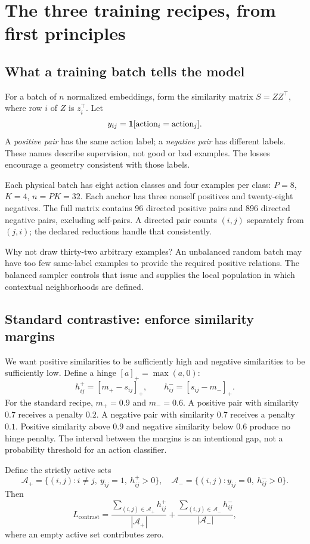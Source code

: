 \clearpage
\section{The three training recipes, from first principles}\label{sec:losses}
\subsection{What a training batch tells the model}
For a batch of $n$ normalized embeddings, form the similarity matrix
$S=ZZ^\top$, where row $i$ of $Z$ is $z_i^\top$. Let
\[
 y_{ij}=\mathbf{1}[\text{action}_i=\text{action}_j].
\]
A \emph{positive pair} has the same action label; a \emph{negative pair} has
different labels. These names describe supervision, not good or bad examples.
The losses encourage a geometry consistent with those labels.

Each physical batch has eight action classes and four examples per class:
$P=8$, $K=4$, $n=PK=32$. Each anchor has three nonself positives and twenty-eight
negatives. The full matrix contains 96 directed positive pairs and 896 directed
negative pairs, excluding self-pairs. A directed pair counts $(i,j)$ separately
from $(j,i)$; the declared reductions handle that consistently.

Why not draw thirty-two arbitrary examples? An unbalanced random batch may have
too few same-label examples to provide the required positive relations. The
balanced sampler controls that issue and supplies the local population in which
contextual neighborhoods are defined.

\subsection{Standard contrastive: enforce similarity margins}
We want positive similarities to be sufficiently high and negative similarities
to be sufficiently low. Define a hinge $[a]_+=\max(a,0)$:
\[
 h^+_{ij}=[m_+-s_{ij}]_+,
 \qquad h^-_{ij}=[s_{ij}-m_-]_+.
\]
For the standard recipe, $m_+=0.9$ and $m_-=0.6$. A positive pair with
similarity $0.7$ receives a penalty $0.2$. A negative pair with similarity $0.7$
receives a penalty $0.1$. Positive similarity above $0.9$ and negative similarity
below $0.6$ produce no hinge penalty. The interval between the margins is an
intentional gap, not a probability threshold for an action classifier.

Define the strictly active sets
\[
 \mathcal A_+=\{(i,j):i\ne j,\ y_{ij}=1,\ h^+_{ij}>0\},\quad
 \mathcal A_-=\{(i,j):y_{ij}=0,\ h^-_{ij}>0\}.
\]
Then
\[
 L_{\mathrm{contrast}}=
 \frac{\sum_{(i,j)\in\mathcal A_+}h^+_{ij}}{|\mathcal A_+|}
 +\frac{\sum_{(i,j)\in\mathcal A_-}h^-_{ij}}{|\mathcal A_-|},
\]
where an empty active set contributes zero.

